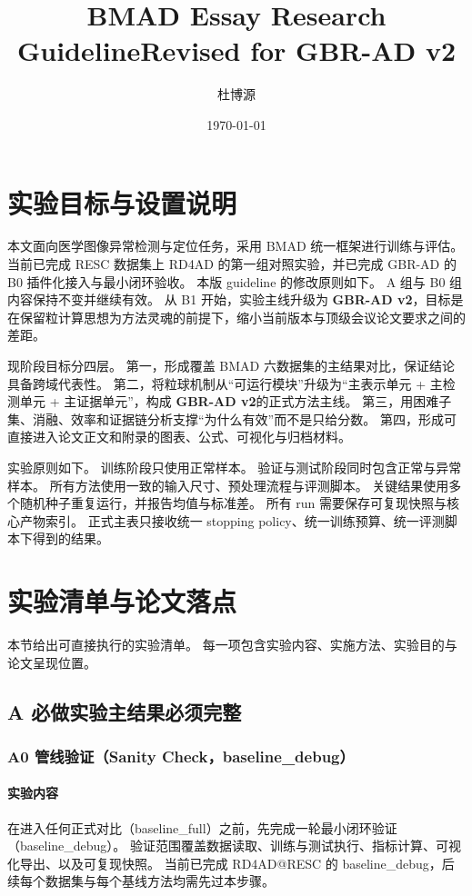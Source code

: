 \documentclass[UTF8,a4paper]{ctexart}
\title{BMAD Essay Research Guideline\quad Revised for GBR-AD v2}
\author{杜博源}
\date{\today}
\newcommand{\gbrvtwo}{\textbf{GBR-AD v2}}
\begin{document}
\maketitle

\section{实验目标与设置说明}
本文面向医学图像异常检测与定位任务，采用 BMAD 统一框架进行训练与评估。
当前已完成 RESC 数据集上 RD4AD 的第一组对照实验，并已完成 GBR-AD 的 B0 插件化接入与最小闭环验收。
本版 guideline 的修改原则如下。
A 组与 B0 组内容保持不变并继续有效。
从 B1 开始，实验主线升级为 \gbrvtwo，目标是在保留粒计算思想为方法灵魂的前提下，缩小当前版本与顶级会议论文要求之间的差距。

现阶段目标分四层。
第一，形成覆盖 BMAD 六数据集的主结果对比，保证结论具备跨域代表性。
第二，将粒球机制从“可运行模块”升级为“主表示单元 + 主检测单元 + 主证据单元”，构成 \gbrvtwo 的正式方法主线。
第三，用困难子集、消融、效率和证据链分析支撑“为什么有效”而不是只给分数。
第四，形成可直接进入论文正文和附录的图表、公式、可视化与归档材料。

实验原则如下。
训练阶段只使用正常样本。
验证与测试阶段同时包含正常与异常样本。
所有方法使用一致的输入尺寸、预处理流程与评测脚本。
关键结果使用多个随机种子重复运行，并报告均值与标准差。
所有 run 需要保存可复现快照与核心产物索引。
正式主表只接收统一 stopping policy、统一训练预算、统一评测脚本下得到的结果。

\section{实验清单与论文落点}
本节给出可直接执行的实验清单。
每一项包含实验内容、实施方法、实验目的与论文呈现位置。

\subsection{A 必做实验\quad 主结果必须完整}

\subsubsection{A0 管线验证（Sanity Check，baseline\_debug）}

\paragraph{实验内容}
在进入任何正式对比（baseline\_full）之前，先完成一轮最小闭环验证（baseline\_debug）。
验证范围覆盖数据读取、训练与测试执行、指标计算、可视化导出、以及可复现快照。
当前已完成 RD4AD@RESC 的 baseline\_debug，后续每个数据集与每个基线方法均需先过本步骤。
\end{document}

